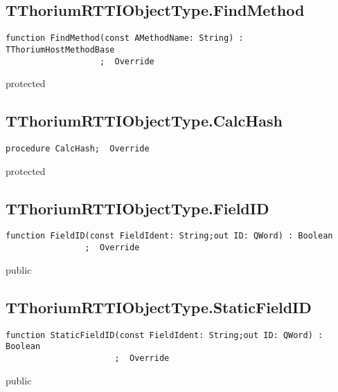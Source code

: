 \subsection{TThoriumRTTIObjectType.FindMethod}
\label{thoriumcore:thorium:tthoriumrttiobjecttype:findmethod}
\begin{FPCList}
\Synopsis
\Declaration 

\begin{verbatim}
function FindMethod(const AMethodName: String) : TThoriumHostMethodBase
                   ;  Override
\end{verbatim}
\Visibility
protected
\Description
\Errors
\end{FPCList}
\subsection{TThoriumRTTIObjectType.CalcHash}
\label{thoriumcore:thorium:tthoriumrttiobjecttype:calchash}
\begin{FPCList}
\Synopsis
\Declaration 

\begin{verbatim}
procedure CalcHash;  Override
\end{verbatim}
\Visibility
protected
\Description
\Errors
\end{FPCList}
\subsection{TThoriumRTTIObjectType.FieldID}
\label{thoriumcore:thorium:tthoriumrttiobjecttype:fieldid}
\begin{FPCList}
\Synopsis
\Declaration 

\begin{verbatim}
function FieldID(const FieldIdent: String;out ID: QWord) : Boolean
                ;  Override
\end{verbatim}
\Visibility
public
\Description
\Errors
\end{FPCList}
\subsection{TThoriumRTTIObjectType.StaticFieldID}
\label{thoriumcore:thorium:tthoriumrttiobjecttype:staticfieldid}
\begin{FPCList}
\Synopsis
\Declaration 

\begin{verbatim}
function StaticFieldID(const FieldIdent: String;out ID: QWord) : Boolean
                      ;  Override
\end{verbatim}
\Visibility
public
\Description
\Errors
\end{FPCList}
